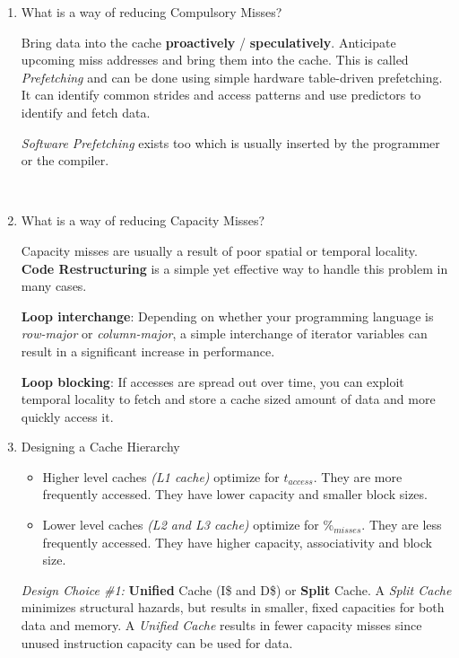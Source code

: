 \documentclass[12pt]{article}
\newenvironment{QandA}{\begin{enumerate}[label=\bfseries\arabic*.]\bfseries}
                      {\end{enumerate}}
\newenvironment{answered}{\par\quad\normalfont}{}
\begin{document}
\begin{QandA}
\

\item What is a way of reducing Compulsory Misses?
\begin{answered}
Bring data into the cache \textbf{proactively} / \textbf{speculatively}. Anticipate upcoming miss addresses and bring them into the cache. This is called \textit{Prefetching} and can be done using simple hardware table-driven prefetching. It can identify common strides and access patterns and use predictors to identify and fetch data. 

\textit{Software Prefetching} exists too which is usually inserted by the programmer or the compiler.
\end{answered}

\ 

\item What is a way of reducing Capacity Misses?
\begin{answered}
Capacity misses are usually a result of poor spatial or temporal locality. \textbf{Code Restructuring} is a simple yet effective way to handle this problem in many cases.

\textbf{Loop interchange}: Depending on whether your programming language is \textit{row-major} or \textit{column-major}, a simple interchange of iterator variables can result in a significant increase in performance.

\textbf{Loop blocking}: If accesses are spread out over time, you can exploit temporal locality to fetch and store a cache sized amount of data and more quickly access it. 
\end{answered}

\newpage 

\item Designing a Cache Hierarchy
\begin{answered}
\vspace{-0.85cm}
\begin{itemize}
    \item Higher level caches \textit{(L1 cache)} optimize for $t_{access}$. They are more frequently accessed. They have lower capacity and smaller block sizes.
    \item Lower level caches \textit{(L2 and L3 cache)} optimize for $\%_{misses}$. They are less frequently accessed. They have higher capacity, associativity and block size.
\end{itemize}

\textit{Design Choice \#1:} \textbf{Unified} Cache (I\$ and D\$) or \textbf{Split} Cache. A \textit{Split Cache} minimizes structural hazards, but results in smaller, fixed capacities for both data and memory. A \textit{Unified Cache} results in fewer capacity misses since unused instruction capacity can be used for data. 


\end{answered}
\end{QandA}
\end{document}
